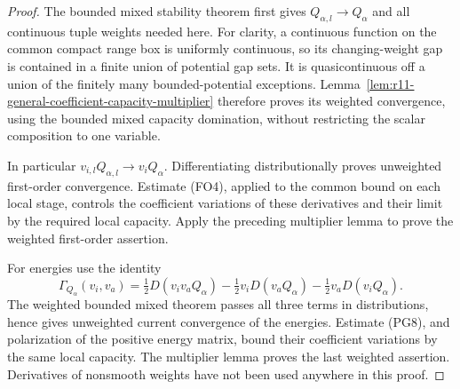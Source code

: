\documentclass[11pt,a4paper]{article}
\numberwithin{equation}{section}
\theoremstyle{definition}
\theoremstyle{remark}
\begin{document}
\begin{proof}
The bounded mixed stability theorem first gives
$Q_{\alpha,l}\to Q_\alpha$ and all continuous tuple
weights needed here. For clarity, a continuous function
on the common compact range box is uniformly continuous,
so its changing-weight gap is contained in a finite
union of potential gap sets. It is quasicontinuous off
a union of the finitely many bounded-potential exceptions.
Lemma~\ref{lem:r11-general-coefficient-capacity-multiplier}
therefore proves its weighted convergence, using the
bounded mixed capacity domination, without restricting
the scalar composition to one variable.

In particular $v_{i,l}Q_{\alpha,l}\to v_iQ_\alpha$.
Differentiating distributionally proves unweighted
first-order convergence. Estimate (FO4), applied to
the common bound on each local stage, controls the
coefficient variations of these derivatives and their
limit by the required local capacity.
Apply the preceding multiplier lemma to prove the
weighted first-order assertion.

For energies use the identity
\[
 \Gamma_{Q_\alpha}(v_i,v_a)
 =\tfrac12D(v_iv_aQ_\alpha)
       -\tfrac12v_iD(v_aQ_\alpha)
       -\tfrac12v_aD(v_iQ_\alpha).
 \tag{GS2}
\]
The weighted bounded mixed theorem passes all three
terms in distributions, hence gives unweighted current
convergence of the energies. Estimate (PG8), and
polarization of the positive energy matrix, bound
their coefficient variations by the same local
capacity. The multiplier lemma proves the last
weighted assertion. Derivatives of nonsmooth weights
have not been used anywhere in this proof.
\end{proof}
\end{document}
